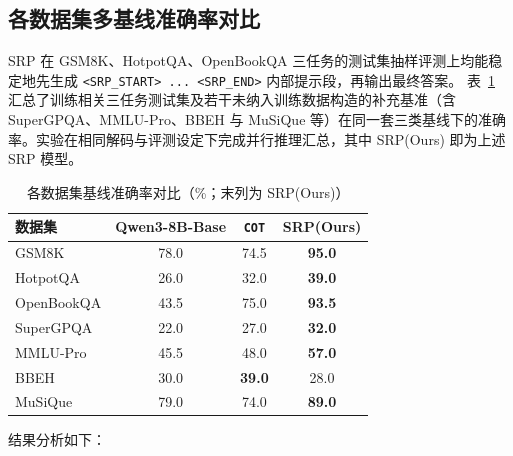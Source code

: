 \subsection{各数据集多基线准确率对比}

SRP 在 GSM8K、HotpotQA、OpenBookQA 三任务的测试集抽样评测上均能稳定地先生成
\texttt{<SRP\_START> ... <SRP\_END>} 内部提示段，再输出最终答案。
表~\ref{tab:baseline_full} 汇总了训练相关三任务测试集及若干未纳入训练数据构造的补充基准（含 SuperGPQA、MMLU-Pro、BBEH 与 MuSiQue 等）在同一套三类基线下的准确率。实验在相同解码与评测设定下完成并行推理汇总，其中 SRP(Ours) 即为上述 SRP 模型。

\begin{table}[htbp]
    \centering
    \caption{各数据集基线准确率对比（\%；末列为 SRP(Ours)）}
    \label{tab:baseline_full}
    \begin{tabular}{lccc}
        \toprule
        \textbf{数据集} & \textbf{Qwen3-8B-Base} & \textbf{\texttt{COT}} & \textbf{SRP(Ours)} \\
        \midrule
        GSM8K      & 78.0 & 74.5 & \textbf{95.0} \\
        HotpotQA   & 26.0 & 32.0 & \textbf{39.0} \\
        OpenBookQA & 43.5 & 75.0 & \textbf{93.5} \\
        SuperGPQA  & 22.0 & 27.0 & \textbf{32.0} \\
        MMLU-Pro   & 45.5 & 48.0 & \textbf{57.0} \\
        BBEH       & 30.0 & \textbf{39.0} & 28.0 \\
        MuSiQue & 79.0 & 74.0 & \textbf{89.0} \\
        \bottomrule
    \end{tabular}
\end{table}

结果分析如下：

